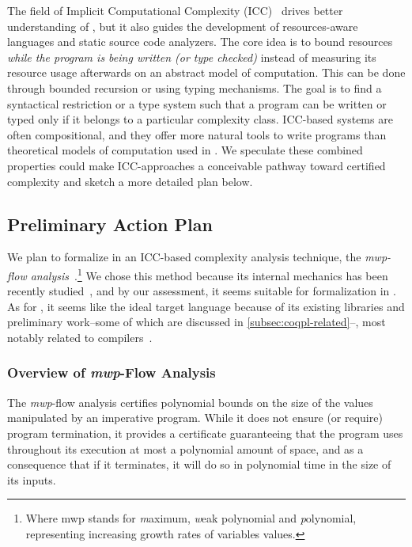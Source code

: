 The field of Implicit Computational Complexity (ICC)~\cite{dallago2011} drives
better understanding of , but it also guides the
development of resources-aware languages and static source code analyzers. The
core idea is to bound resources \emph{while the program is being written (or
type checked)} instead of measuring its resource usage afterwards on an abstract
model of computation. This can be done through \eg bounded
recursion or using typing mechanisms. The goal is to find a syntactical
restriction or a type system such that a program can be written or typed only if
it belongs to a particular complexity class. ICC-based systems are often
compositional, and they offer more natural tools to
write programs than theoretical models of computation used in . We speculate these combined properties could make ICC-approaches a
conceivable pathway toward certified complexity and sketch a more detailed plan
below.

\subsection{Preliminary Action Plan}
\label{subsec:coqpl-preliminary-action-plan}

We plan to formalize in  an ICC-based complexity analysis technique,
the \emph{mwp-flow analysis}~\cite{jones2009}.\footnote{
    Where mwp stands for \emph{m}aximum, \emph{w}eak polynomial and
    \emph{p}olynomial, representing increasing growth rates of variables
    values.}
We chose this method because its internal mechanics has been recently
studied~\cite{aubert20222}, and by our assessment, it seems suitable for
formalization in . As for , it seems like the ideal target
language because of its existing libraries and preliminary work--some of which
are discussed in \autoref{subsec:coqpl-related}--, most notably related to
compilers~\cite{leroy2009}.

\subsubsection{Overview of \emph{mwp}-Flow Analysis}
\label{subsubsec:coqpl-overview-of-mwp-flow-analysis}

The \emph{mwp}-flow analysis certifies polynomial bounds on the size of the values manipulated by an imperative program.
While it does not ensure (or require) program termination, it provides a certificate guaranteeing that the program uses throughout its execution at most a polynomial amount of space, and as a consequence that if it terminates, it will do so in polynomial time in the size of its inputs.

